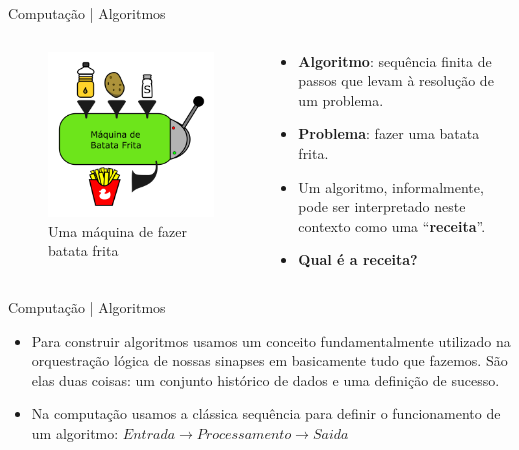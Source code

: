 \documentclass{beamer}
\begin{document}
\begin{frame}{Computação | Algoritmos}
    \begin{columns}
        \begin{column}{0.5\textwidth}
            \begin{figure}
                \centering
                \includegraphics[width=0.7\linewidth]{img/maquina-de-batata.png}
                \caption{Uma máquina de fazer batata frita}
                \label{fig:enter-label}
            \end{figure}
        \end{column}
        \begin{column}{0.5\textwidth}
            \begin{itemize}
                \item \textbf{Algoritmo}: sequência finita de passos que levam à resolução de um problema.
                \item \textbf{Problema}: fazer uma batata frita.
                \item Um algoritmo, informalmente, pode ser interpretado neste contexto como uma ``\textbf{receita}''.
                \item \textbf{Qual é a receita?}
            \end{itemize}
        \end{column}
    \end{columns}
\end{frame}

\begin{frame}{Computação | Algoritmos}
    \begin{itemize}
        \item Para construir algoritmos usamos um conceito fundamentalmente utilizado na orquestração lógica de nossas sinapses em basicamente tudo que fazemos. São elas duas coisas: um conjunto histórico de dados e uma definição de sucesso.
        \item Na computação usamos a clássica sequência para definir o funcionamento de um algoritmo: $ Entrada \rightarrow Processamento \rightarrow Saida$
    \end{itemize}
\end{frame}
\end{document}
